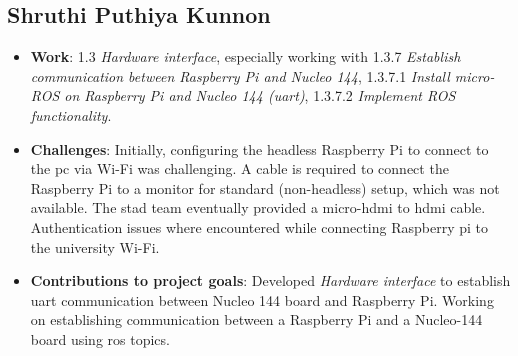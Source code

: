 \subsection*{Shruthi Puthiya Kunnon}
\begin{itemize}
    \item \textbf{Work}: 1.3 \textit{Hardware interface}, especially working with 1.3.7 \textit{Establish communication between Raspberry Pi and Nucleo 144}, 1.3.7.1 \textit{Install micro-ROS on Raspberry Pi and Nucleo 144 (\ac{uart})}, 1.3.7.2 \textit{Implement ROS functionality}.
    \item \textbf{Challenges}: Initially, configuring the headless Raspberry Pi to connect to the \ac{pc} via Wi-Fi was challenging. A cable is required to connect the Raspberry Pi to a monitor for standard (non-headless) setup, which was not available. The \ac{stad} team eventually provided a micro-\ac{hdmi} to \ac{hdmi} cable. Authentication issues where encountered while connecting Raspberry pi to the university Wi-Fi.
    \item \textbf{Contributions to project goals}: Developed \textit{Hardware interface} to establish \ac{uart} communication between Nucleo 144 board and Raspberry Pi. Working on establishing communication between a Raspberry Pi and a Nucleo-144 board using \ac{ros} topics. 
\end{itemize}

